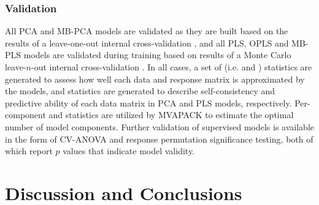 \subsubsection{Validation}

\begin{doublespace}
All PCA and MB-PCA models are validated as they are built based on the results
of a leave-one-out internal cross-validation
\cite{eastment:tech1982,eshghi:cils2014}, and all PLS, OPLS and MB-PLS models
are validated during training based on results of a Monte Carlo leave-$n$-out
internal cross-validation \cite{xu:cils2001,xu:jchemo2004}. In all cases, a
set of \rsq{} (i.e. \rsqx{} and \rsqy{}) statistics are generated to assess
how well each data and response matrix is approximated by the models, and
\qsq{} statistics are generated to describe self-consistency and predictive
ability of each data matrix in PCA and PLS models, respectively. Per-component
\rsq{} and \qsq{} statistics are utilized by MVAPACK to estimate the optimal
number of model components. Further validation of supervised models is
available in the form of CV-ANOVA \cite{eriksson:jchemo2008} and response
permutation \cite{westerhuis:metab2008} significance testing, both of which
report $p$ values that indicate model validity.
\end{doublespace}

\section{Discussion and Conclusions}

